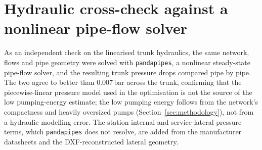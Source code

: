 \documentclass[a4paper,fleqn]{cas-sc}
\newcommand{\new}[1]{\textcolor[HTML]{1A5FB4}{#1}}   %
\newcommand{\new}[1]{#1}
\begin{document}


\appendix

\section{Hydraulic cross-check against a nonlinear pipe-flow solver}\label{app:pandapipes}
As an independent check on the linearised trunk hydraulics, the same network, flows and pipe
geometry were solved with \texttt{pandapipes}, a nonlinear steady-state pipe-flow solver, and
the resulting trunk pressure drops compared pipe by pipe. The two agree to better than
$0.007$\,bar across the trunk, confirming that the piecewise-linear pressure model used in the
optimisation is not the source of the low pumping-energy estimate; the low pumping energy
follows from the network's compactness and heavily oversized pumps (Section~\ref{sec:methodology}),
not from a hydraulic modelling error. The station-internal and service-lateral pressure terms,
which \texttt{pandapipes} does not resolve, are added from the manufacturer datasheets and the
DXF-reconstructed lateral geometry.

\new{}
\new{}

\printcredits


\end{document}
